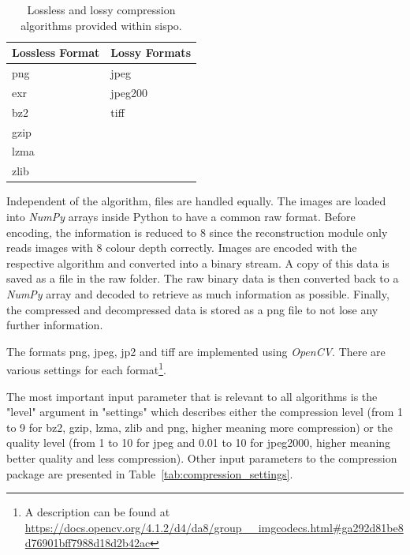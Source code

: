 \begin{table}[htb]
    \centering
    \caption{Lossless and lossy compression algorithms provided within \gls{sispo}.}
    \label{tab:compression_format}
    \begin{tabular}{l|l}
        \textbf{Lossless Format} & \textbf{Lossy Formats} \\ \hline
        png               & jpeg           \\
        exr               & jpeg200        \\
        bz2               & tiff           \\
        gzip              &                \\
        lzma              &                \\
        zlib              &               
    \end{tabular}
\end{table}

Independent of the algorithm, files are handled equally. The images are loaded into \textit{NumPy} arrays inside Python to have a common raw format. Before encoding, the information is reduced to \SI{8}{\bit} since the reconstruction module only reads images with \SI{8}{\bit} colour depth correctly. Images are encoded with the respective algorithm and converted into a binary stream. A copy of this data is saved as a file in the raw folder. The raw binary data is then converted back to a \textit{NumPy} array and decoded to retrieve as much information as possible. Finally, the compressed and decompressed data is stored as a png file to not lose any further information.

The formats png, jpeg, \gls{jp2} and tiff are implemented using \textit{OpenCV}. There are various settings for each format\footnote{A description can be found at \url{https://docs.opencv.org/4.1.2/d4/da8/group__imgcodecs.html\#ga292d81be8d76901bff7988d18d2b42ac}}.

The most important input parameter that is relevant to all algorithms is the "level" argument in "settings" which describes either the compression level (from 1 to 9 for bz2, gzip, lzma, zlib and png, higher meaning more compression) or the quality level (from 1 to 10 for jpeg and 0.01 to 10 for jpeg2000, higher meaning better quality and less compression). Other input parameters to the compression package are presented in Table~\ref{tab:compression_settings}.

